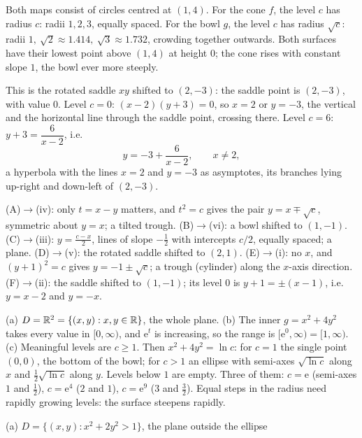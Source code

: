 \begin{solutions}
  \item Both maps consist of circles centred at $(1,4)$. For the cone $f$,
        the level $c$ has radius $c$: radii $1,2,3$, equally spaced. For
        the bowl $g$, the level $c$ has radius $\sqrt{c}$: radii
        $1,\ \sqrt2\approx1.414,\ \sqrt3\approx1.732$, crowding together
        outwards. Both surfaces have their lowest point above $(1,4)$ at
        height $0$; the cone rises with constant slope $1$, the bowl ever
        more steeply.
  \item This is the rotated saddle $xy$ shifted to $(2,-3)$: the saddle
        point is $(2,-3)$, with value $0$. Level $c=0$: $(x-2)(y+3)=0$, so
        $x=2$ or $y=-3$, the vertical and the horizontal line through the
        saddle point, crossing there. Level $c=6$: $y+3=\dfrac{6}{x-2}$,
        i.e.
        \[
          y=-3+\frac{6}{x-2},\qquad x\neq2,
        \]
        a hyperbola with the lines $x=2$ and $y=-3$ as asymptotes, its
        branches lying up-right and down-left of $(2,-3)$.
  \item (A)$\to$(iv): only $t=x-y$ matters, and $t^{2}=c$ gives the pair
        $y=x\mp\sqrt{c}$, symmetric about $y=x$; a tilted trough.
        (B)$\to$(vi): a bowl shifted to $(1,-1)$.
        (C)$\to$(iii): $y=\tfrac{c-x}{2}$, lines of slope $-\tfrac12$ with
        intercepts $c/2$, equally spaced; a plane.
        (D)$\to$(v): the rotated saddle shifted to $(2,1)$.
        (E)$\to$(i): no $x$, and $(y+1)^{2}=c$ gives $y=-1\pm\sqrt{c}$; a
        trough (cylinder) along the $x$-axis direction.
        (F)$\to$(ii): the saddle shifted to $(1,-1)$; its level $0$ is
        $y+1=\pm(x-1)$, i.e.\ $y=x-2$ and $y=-x$.
  \item (a) $D=\mathbb{R}^{2}=\{(x,y):x,y\in\mathbb{R}\}$, the whole plane.
        (b) The inner $g=x^{2}+4y^{2}$ takes every value in $[0,\infty)$,
        and $\mathrm{e}^{t}$ is increasing, so the range is
        $[\mathrm{e}^{0},\infty)=[1,\infty)$.
        (c) Meaningful levels are $c\ge1$. Then
        $x^{2}+4y^{2}=\ln c$: for $c=1$ the single point $(0,0)$, the bottom
        of the bowl; for $c>1$ an ellipse with semi-axes $\sqrt{\ln c}$
        along $x$ and $\tfrac12\sqrt{\ln c}$ along $y$. Levels below $1$ are
        empty. Three of them: $c=\mathrm{e}$ (semi-axes $1$ and
        $\tfrac12$), $c=\mathrm{e}^{4}$ ($2$ and $1$), $c=\mathrm{e}^{9}$
        ($3$ and $\tfrac32$). Equal steps in the radius need rapidly
        growing levels: the surface steepens rapidly.
  \item (a) $D=\{(x,y):x^{2}+2y^{2}>1\}$, the plane outside the ellipse

\end{solutions}
